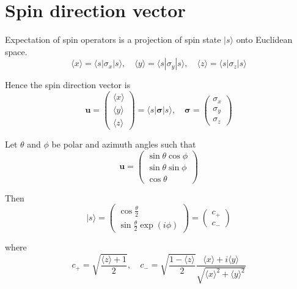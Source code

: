 

\section*{Spin direction vector}

Expectation of spin operators is a projection of spin state $|s\rangle$ onto Euclidean space.
\begin{equation*}
\langle x\rangle=\langle s|\sigma_x|s\rangle,
\quad
\langle y\rangle=\langle s|\sigma_y|s\rangle,
\quad
\langle z\rangle=\langle s|\sigma_z|s\rangle
\end{equation*}

Hence the spin direction vector is
\begin{equation*}
\mathbf u=\begin{pmatrix}\langle x\rangle\\[1ex]\langle y\rangle\\[1ex]\langle z\rangle\end{pmatrix}
=\langle s|\boldsymbol\sigma|s\rangle,
\quad
\boldsymbol\sigma=\begin{pmatrix}\sigma_x\\\sigma_y\\\sigma_z\end{pmatrix}
\end{equation*}

Let $\theta$ and $\phi$ be polar and azimuth angles such that
\begin{equation*}
\mathbf u=\begin{pmatrix}\sin\theta\cos\phi\\\sin\theta\sin\phi\\\cos\theta\end{pmatrix}
\end{equation*}

Then
\begin{equation*}
|s\rangle=\begin{pmatrix}\cos\frac{\theta}{2}\\[1ex]\sin\frac{\theta}{2}\exp(i\phi)\end{pmatrix}
=\begin{pmatrix}c_+\\c_-\end{pmatrix}
\end{equation*}

where
\begin{equation*}
c_+=\sqrt{\frac{\langle z\rangle+1}{2}},\quad
c_-=\sqrt{\frac{1-\langle z\rangle}{2}}
\frac{\langle x\rangle+i\langle y\rangle}{\sqrt{\langle x\rangle^2+\langle y\rangle^2}}
\end{equation*}


